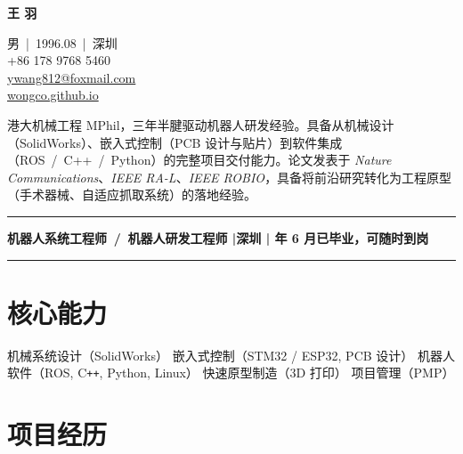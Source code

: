 \documentclass[11pt,a4paper]{article}
\begin{document}
\begin{minipage}[t]{0.50\textwidth}
  {\Huge\sffamily\bfseries\color{accent} 王 羽}
\end{minipage}
\begin{minipage}[t]{0.50\textwidth}
  \raggedleft
  \small
  \textcolor{midgray}{男 \,|\, 1996.08 \,|\, 深圳} \\[0.12em]
  +86 178 9768 5460 \\[0.12em]
  \href{mailto:ywang812@foxmail.com}{ywang812@foxmail.com} \\[0.12em]
  \href{https://wongco.github.io}{wongco.github.io}
\end{minipage}

\vspace{0.35em}

{\small\color{midgray}
港大机械工程 MPhil，三年半腱驱动机器人研发经验。具备从机械设计（SolidWorks）、嵌入式控制（PCB 设计与贴片）到软件集成（ROS~/~C++~/~Python）的完整项目交付能力。论文发表于 \textit{Nature Communications}、\textit{IEEE RA-L}、\textit{IEEE ROBIO}，具备将前沿研究转化为工程原型（手术器械、自适应抓取系统）的落地经验。
}

\vspace{0.4em}

\textcolor{accent}{\rule{\textwidth}{1.2pt}}
\vspace{0.15em}
\centering
{\sffamily\bfseries 机器人系统工程师 \,/\, 机器人研发工程师 \quad|\quad 深圳 \quad| 年 6 月已毕业，可随时到岗}
\vspace{0.15em}
\textcolor{accent}{\rule{\textwidth}{1.2pt}}

\raggedright
\vspace{0.25em}

\section{核心能力}

{\small 机械系统设计（SolidWorks） \textbar{} 嵌入式控制（STM32 / ESP32, PCB 设计） \textbar{} 机器人软件（ROS, C\texttt{++}, Python, Linux） \textbar{} 快速原型制造（3D 打印） \textbar{} 项目管理（PMP）}

\section{项目经历}
\end{document}
